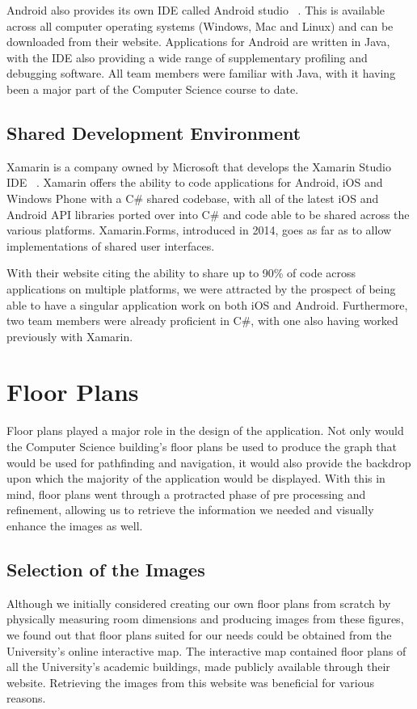 \documentclass[12pt,a4paper]{report}
\begin{document}
Android also provides its own IDE called Android studio ~\cite{androidStudio}. This is available across all computer operating systems (Windows, Mac and Linux) and can be downloaded from their website. Applications for Android are written in Java, with the IDE also providing a wide range of supplementary profiling and debugging software. All team members were familiar with Java, with it having been a major part of the Computer Science course to date.

\subsection{Shared Development Environment}

Xamarin is a company owned by Microsoft that develops the Xamarin Studio IDE ~\cite{xamarin}. Xamarin offers the ability to code applications for Android, iOS and Windows Phone with a C\# shared codebase, with all of the latest iOS and Android API libraries ported over into C\# and code able to be shared across the various platforms. Xamarin.Forms, introduced in 2014, goes as far as to allow implementations of shared user interfaces.

With their website citing the ability to share up to 90\% of code across applications on multiple platforms, we were attracted by the prospect of being able to have a singular application work on both iOS and Android. Furthermore, two team members were already proficient in C\#, with one also having worked previously with Xamarin.

\section{Floor Plans}
\label{sec:floorPlans}
Floor plans played a major role in the design of the application. Not only would the Computer Science building's floor plans be used to produce the graph that would be used for pathfinding and navigation, it would also provide the backdrop upon which the majority of the application would be displayed. With this in mind, floor plans went through a protracted phase of pre processing and refinement, allowing us to retrieve the information we needed and visually enhance the images as well.

\subsection{Selection of the Images}

Although we initially considered creating our own floor plans from scratch by physically measuring room dimensions and producing images from these figures, we found out that floor plans suited for our needs could be obtained from the University's online interactive map. The interactive map contained floor plans of all the University's academic buildings, made publicly available through their website. Retrieving the images from this website was beneficial for various reasons.
\end{document}
